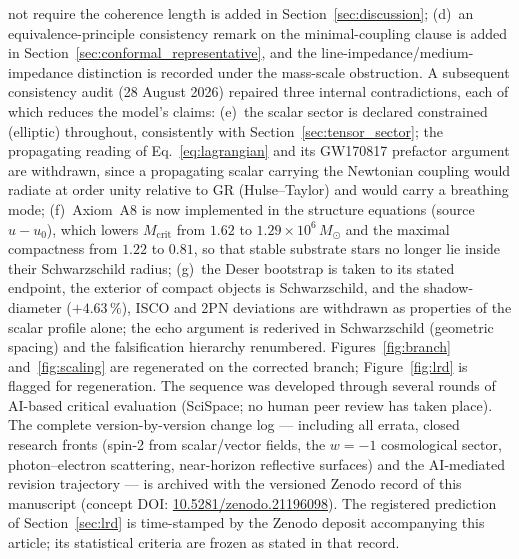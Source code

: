 \documentclass[11pt,a4paper]{article}
\theoremstyle{plain}
\theoremstyle{remark}
\begin{document}
not require the coherence length is added in Section~\ref{sec:discussion}; (d)~an equivalence-principle consistency remark on the minimal-coupling clause is added in Section~\ref{sec:conformal_representative}, and the line-impedance/medium-impedance distinction is recorded under the mass-scale obstruction. A subsequent consistency audit (28 August 2026) repaired three internal contradictions, each of which reduces the model's claims: (e)~the scalar sector is declared constrained (elliptic) throughout, consistently with Section~\ref{sec:tensor_sector}; the propagating reading of Eq.~\eqref{eq:lagrangian} and its GW170817 prefactor argument are withdrawn, since a propagating scalar carrying the Newtonian coupling would radiate at order unity relative to GR (Hulse--Taylor) and would carry a breathing mode; (f)~Axiom~A8 is now implemented in the structure equations (source $u - u_0$), which lowers $M_{\text{crit}}$ from $1.62$ to $1.29\times10^{6}\,M_\odot$ and the maximal compactness from $1.22$ to $0.81$, so that stable substrate stars no longer lie inside their Schwarzschild radius; (g)~the Deser bootstrap is taken to its stated endpoint, the exterior of compact objects is Schwarzschild, and the shadow-diameter ($+4.63\,\%$), ISCO and 2PN deviations are withdrawn as properties of the scalar profile alone; the echo argument is rederived in Schwarzschild (geometric spacing) and the falsification hierarchy renumbered. Figures~\ref{fig:branch} and~\ref{fig:scaling} are regenerated on the corrected branch; Figure~\ref{fig:lrd} is flagged for regeneration. The sequence was developed through several rounds of AI-based critical evaluation (SciSpace; no human peer review has taken place). The complete version-by-version change log --- including all errata, closed research fronts (spin-2 from scalar/vector fields, the $w=-1$ cosmological sector, photon--electron scattering, near-horizon reflective surfaces) and the AI-mediated revision trajectory --- is archived with the versioned Zenodo record of this manuscript (concept DOI: \href{https://doi.org/10.5281/zenodo.21196098}{10.5281/zenodo.21196098}). The registered prediction of Section~\ref{sec:lrd} is time-stamped by the Zenodo deposit accompanying this article; its statistical criteria are frozen as stated in that record.

\end{document}
